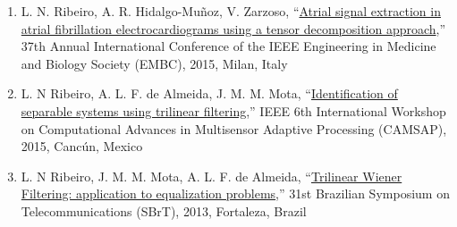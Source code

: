 \begin{enumerate}
	\item L. N. Ribeiro, A. R. Hidalgo-Mu\~{n}oz, V. Zarzoso, ``\href{https://doi.org/10.1109/EMBC.2015.7320000}{Atrial signal extraction in atrial fibrillation electrocardiograms using a tensor decomposition approach},'' 37th Annual International Conference of the IEEE Engineering in Medicine and Biology Society (EMBC), 2015, Milan, Italy
	
	 \item L. N Ribeiro,  A. L. F. de Almeida, J. M. M. Mota, ``\href{https://doi.org/10.1109/CAMSAP.2015.7383768}{Identification of separable systems using trilinear filtering},'' IEEE 6th International Workshop on Computational Advances in Multisensor Adaptive Processing (CAMSAP), 2015, Canc\'{u}n, Mexico
	
	 \item L. N Ribeiro, J. M. M. Mota, A. L. F. de Almeida, ``\href{https://github.com/lnribeiro/lnribeiro.github.io/blob/master/assets/pdf/sbrt13.pdf}{Trilinear Wiener Filtering: application to equalization problems},''  31st Brazilian Symposium on Telecommunications (SBrT), 2013, Fortaleza, Brazil
\end{enumerate}